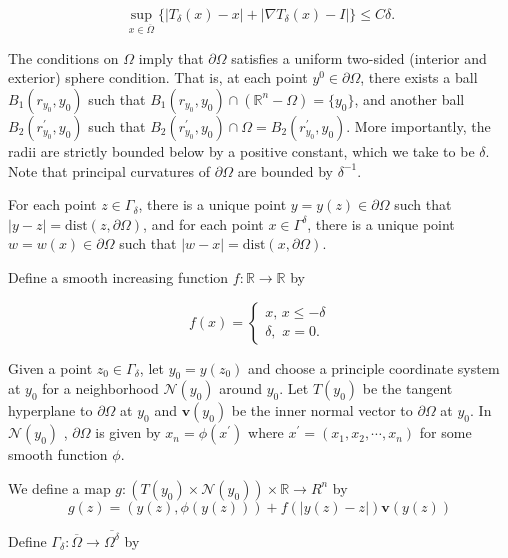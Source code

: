 \documentclass[11pt,reqno]{amsart}
\numberwithin{figure}{section}
\theoremstyle{plain}
\theoremstyle{remark}
\numberwithin{equation}{section}
\begin{document}
$$\sup_{x\in \overline{\Omega}}\{|T_\delta(x)-x|+|\nabla T_\delta(x)-I|\} \leq C \delta.$$


The conditions on $\Omega$ imply that $\partial \Omega$ satisfies a uniform two-sided (interior and exterior) sphere condition. That is, at each point $y^0 \in \partial \Omega$, there exists a ball $B_1(r_{y_0}, y_0)$ such that $B_1(r_{y_0}, y_0) \cap (\mathbb{R}^n - \Omega)=\{y_0\}$, and another ball $B_2(r^\prime_{y_0}, y_0)$ such that $B_2(r^\prime_{y_0}, y_0) \cap  \Omega=B_2(r^\prime_{y_0}, y_0)$. More importantly, the radii are strictly bounded below by a positive constant, which we take to be $\delta$. Note that principal curvatures of $\partial \Omega$ are bounded by $\delta^{-1}$. 

For each point $z \in \Gamma_\delta$, there is a unique point $y=y(z) \in \partial \Omega$ such that $|y-z|=\mathrm{dist}(z, \partial \Omega)$, and for each point $x \in \Gamma^\delta$, there is a unique point $w=w(x) \in \partial \Omega$ such that $|w-x|= \mathrm{dist}(x, \partial \Omega)$.

Define a smooth increasing function $f: \mathbb{R} \to \mathbb{R}$ by

\begin{equation}
f(x)=\left\{  
   \begin{aligned}
   x, \, x \leq -\delta\\
   \delta, \, \, x=0.
  \end{aligned}
\right.
\end{equation}

Given a point $z_0 \in \Gamma_\delta$, let $y_0= y(z_0)$ and choose a principle coordinate system at $y_0$ for a neighborhood $\mathcal{N}(y_0)$ around $y_0$. Let $T(y_0)$ be the tangent hyperplane to $\partial \Omega$ at $y_0$ and $\mathbf{v}(y_0)$ be the inner normal vector to $\partial \Omega$ at $y_0$. In $\mathcal{N}(y_0)$ , $\partial \Omega$ is given by $x_n=\phi(x^\prime)$ where $x^\prime=(x_1, x_2, \cdots, x_n)$ for some smooth function $\phi$.

We define a map $g: (T(y_0) \times \mathcal{N}(y_0)) \times \mathbb{R} \to R^n $ by
$$g(z)=(y(z), \phi (y(z))) + f(|y(z)-z|) \mathbf{v}(y(z))$$

Define $\Gamma_\delta : \overline{\Omega} \to \overline{\Omega^\delta}$ by






{}
%

\end{document}
